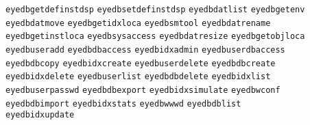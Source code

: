 \begin{tabbing}
\texttt{eyedbgetdefinstdsp} \> \texttt{eyedbsetdefinstdsp} \> \texttt{eyedbdatlist} \> \texttt{eyedbgetenv} \\
\texttt{eyedbdatmove} \> \texttt{eyedbgetidxloca} \> \texttt{eyedbsmtool} \> \texttt{eyedbdatrename} \\
\texttt{eyedbgetinstloca} \> \texttt{eyedbsysaccess} \> \texttt{eyedbdatresize} \> \texttt{eyedbgetobjloca} \\
\texttt{eyedbuseradd} \> \texttt{eyedbdbaccess} \> \texttt{eyedbidxadmin} \> \texttt{eyedbuserdbaccess} \\
\texttt{eyedbdbcopy} \> \texttt{eyedbidxcreate} \> \texttt{eyedbuserdelete} \> \texttt{eyedbdbcreate} \\
\texttt{eyedbidxdelete} \> \texttt{eyedbuserlist} \> \texttt{eyedbdbdelete} \> \texttt{eyedbidxlist} \\
\texttt{eyedbuserpasswd} \> \texttt{eyedbdbexport} \> \texttt{eyedbidxsimulate} \> \texttt{eyedbwconf} \\
\texttt{eyedbdbimport} \> \texttt{eyedbidxstats} \> \texttt{eyedbwwwd} \> \texttt{eyedbdblist} \\
\texttt{eyedbidxupdate} \\


\end{tabbing}
